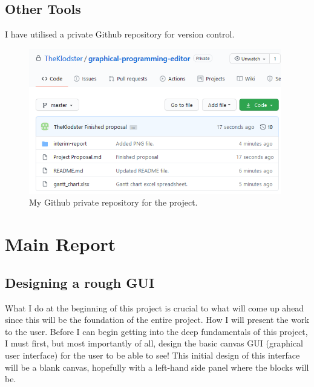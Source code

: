 \documentclass[a4paper, 12pt]{article}
\begin{document}
        \subsection{Other Tools}
            I have utilised a private Github repository for version control.

            \begin{figure}[h]
                \centering
                \includegraphics[width=110mm]{github.png}
                \caption{My Github private repository for the project.}
            \end{figure}
    
    \clearpage
    \section{Main Report}
        \subsection{Designing a rough GUI}
            What I do at the beginning of this project is crucial to what will come up ahead since this
            will be the foundation of the entire project. How I will present the work to the user. Before
            I can begin getting into the deep fundamentals of this project, I must first, but most
            importantly of all, design the basic canvas GUI (graphical user interface) for the user to
            be able to see! This initial design of this interface will be a blank canvas, hopefully
            with a left-hand side panel where the blocks will be. \\
\end{document}
